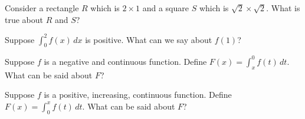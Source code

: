 \documentclass{ximera}
\newcommand{\recommendation}[1]{}
\begin{document}
\begin{shuffle}


\begin{problem}
  Consider a rectangle $R$ which is $2 \times 1$ and a square $S$
  which is $\sqrt{2} \times \sqrt{2}$.  What is true about $R$ and
  $S$?
  \begin{multipleChoice}
  \end{multipleChoice}
\end{problem}

\begin{problem}
  Suppose $\int_0^2 f(x) \, dx$ is positive.  What can we say about $f(1)$?
  \begin{multipleChoice}
  \end{multipleChoice}
\end{problem}



\begin{problem}
  Suppose $f$ is a negative and continuous function.  Define $F(x) = \int_x^0 f(t) \, dt$.  What can be said about $F$?
  \begin{multipleChoice}
  \end{multipleChoice}
\end{problem}

\begin{problem}
  Suppose $f$ is a positive, increasing, continuous function.  Define $F(x) = \int_0^x f(t) \, dt$.  What can be said about $F$?
  \begin{multipleChoice}
  \end{multipleChoice}
\end{problem}


\end{shuffle}
\end{document}
